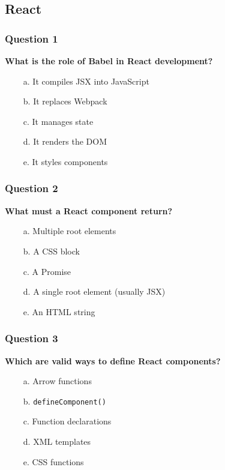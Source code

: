 \documentclass{article}
\newcommand{\cmark}{\textcolor{green}{\ding{51}}} %
\newcommand{\xmark}{\textcolor{red}{\ding{55}}}   %
\begin{document}
\subsection{React}

\subsubsection*{Question 1}
\textbf{What is the role of Babel in React development?}

\begin{itemize}
  \item[\cmark\ a.] It compiles JSX into JavaScript
  \item[\xmark\ b.] It replaces Webpack
  \item[\xmark\ c.] It manages state
  \item[\xmark\ d.] It renders the DOM
  \item[\xmark\ e.] It styles components
\end{itemize}

\subsubsection*{Question 2}
\textbf{What must a React component return?}

\begin{itemize}
  \item[\xmark\ a.] Multiple root elements
  \item[\xmark\ b.] A CSS block
  \item[\xmark\ c.] A Promise
  \item[\cmark\ d.] A single root element (usually JSX)
  \item[\xmark\ e.] An HTML string
\end{itemize}

\subsubsection*{Question 3}
\textbf{Which are valid ways to define React components?}

\begin{itemize}
  \item[\cmark\ a.] Arrow functions
  \item[\xmark\ b.] \texttt{defineComponent()}
  \item[\cmark\ c.] Function declarations
  \item[\xmark\ d.] XML templates
  \item[\xmark\ e.] CSS functions
\end{itemize}
\end{document}

